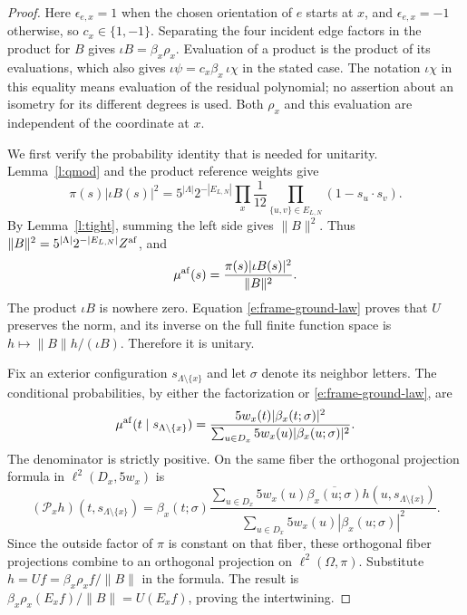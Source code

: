 \begin{proof}
Here \(\epsilon_{e,x}=1\) when the chosen orientation of \(e\)
starts at \(x\), and \(\epsilon_{e,x}=-1\) otherwise, so
\(c_x\in\{1,-1\}\). Separating the four incident edge factors
in the product for \(B\) gives \(\iota B=\beta_x\rho_x\).
Evaluation of a product is the product of its evaluations, which
also gives \(\iota\psi=c_x\beta_x\,\iota\chi\) in the stated
case. The notation \(\iota\chi\) in this equality means evaluation
of the residual polynomial; no assertion about an isometry for its
different degrees is used. Both \(\rho_x\) and this evaluation
are independent of the coordinate at \(x\).

We first verify the probability identity that is needed for
unitarity. Lemma~\ref{l:qmod} and the product reference weights give
\begin{equation}\label{e:frame-ground-weight}
 \pi(s)|\iota B(s)|^2
 =5^{|\Lambda|}2^{-|E_{L,N}|}
       \prod_x\frac1{12}
       \prod_{\{u,v\}\in E_{L,N}}(1-s_u\cdot s_v).
\end{equation}
By Lemma~\ref{l:tight}, summing the left side gives \(\|B\|^2\).
Thus
\(\|B\|^2=5^{|\Lambda|}2^{-|E_{L,N}|}Z^{\rm af}\), and
\begin{equation}\label{e:frame-ground-law}
 \mu^{\rm af}(s)=\frac{\pi(s)|\iota B(s)|^2}{\|B\|^2}.
\end{equation}
The product \(\iota B\) is nowhere zero. Equation
\eqref{e:frame-ground-law} proves that \(U\) preserves the norm,
and its inverse on the full finite function space is
\(h\mapsto\|B\|h/(\iota B)\). Therefore it is unitary.

Fix an exterior configuration \(s_{\Lambda\setminus\{x\}}\)
and let \(\sigma\) denote its neighbor letters. The conditional
probabilities, by either the factorization or
\eqref{e:frame-ground-law}, are
\[
 \mu^{\rm af}(t\mid s_{\Lambda\setminus\{x\}})
 =\frac{5w_x(t)|\beta_x(t;\sigma)|^2}
        {\sum_{u\in D_x}5w_x(u)|\beta_x(u;\sigma)|^2}.
\]
The denominator is strictly positive. On the same fiber the
orthogonal projection formula in \(\ell^2(D_x,5w_x)\) is
\[
 (\mathcal P_xh)(t,s_{\Lambda\setminus\{x\}})
 =\beta_x(t;\sigma)
  \frac{\sum_{u\in D_x}5w_x(u)\overline{\beta_x(u;\sigma)}
                         h(u,s_{\Lambda\setminus\{x\}})}
       {\sum_{u\in D_x}5w_x(u)|\beta_x(u;\sigma)|^2}.
\]
Since the outside factor of \(\pi\) is constant on that fiber,
these orthogonal fiber projections combine to an orthogonal
projection on \(\ell^2(\Omega,\pi)\).
Substitute \(h=Uf=\beta_x\rho_x f/\|B\|\) in the formula.
The result is \(\beta_x\rho_x(E_xf)/\|B\|=U(E_xf)\), proving
the intertwining.


\end{proof}
